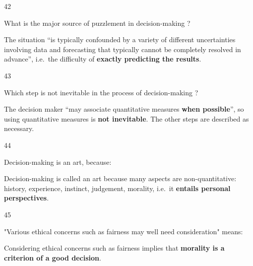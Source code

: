 \begin{question}{42}
{What is the major source of puzzlement in decision-making ?\par}
\begin{explain}
The situation ``is typically confounded by a variety of different uncertainties involving data and forecasting that typically cannot be completely resolved in advance'', i.e.\ the difficulty of \textbf{exactly predicting the results}.
\end{explain}
\end{question}

\begin{question}{43}
{Which step is not inevitable in the process of decision-making ?\par}
\begin{explain}
The decision maker ``may associate quantitative measures \textbf{when possible}'', so using quantitative measures is \textbf{not inevitable}. The other steps are described as necessary.
\end{explain}
\end{question}

\begin{question}{44}
{Decision-making is an art, because:\par}
\begin{explain}
Decision-making is called an art because many aspects are non-quantitative: history, experience, instinct, judgement, morality, i.e.\ it \textbf{entails personal perspectives}.
\end{explain}
\end{question}

\begin{question}{45}
{"Various ethical concerns such as fairness may well need consideration" means:\par}
\begin{explain}
Considering ethical concerns such as fairness implies that \textbf{morality is a criterion of a good decision}.
\end{explain}
\end{question}

